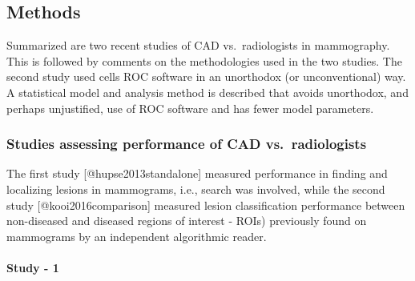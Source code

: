 \documentclass[
]{article}
\begin{document}
\hypertarget{standalone-cad-radiologists-methods}{%
\subsection{Methods}\label{standalone-cad-radiologists-methods}}

Summarized are two recent studies of CAD vs.~radiologists in mammography.
This is followed by comments on the methodologies used in the two studies.
The second study used cells ROC software in an unorthodox (or unconventional) way.
A statistical model and analysis method is described that avoids unorthodox, and perhaps unjustified, use of ROC software and has fewer model parameters.

\hypertarget{standalone-cad-radiologists-two-previous-studies}{%
\subsubsection{Studies assessing performance of CAD vs.~radiologists}\label{standalone-cad-radiologists-two-previous-studies}}

The first study {[}@hupse2013standalone{]} measured performance in finding and localizing lesions in mammograms, i.e., search was involved, while the second study {[}@kooi2016comparison{]} measured lesion classification performance between non-diseased and diseased regions of interest - ROIs) previously found on mammograms by an independent algorithmic reader.

\hypertarget{standalone-cad-radiologists-study1}{%
\paragraph{Study - 1}\label{standalone-cad-radiologists-study1}}
\end{document}
